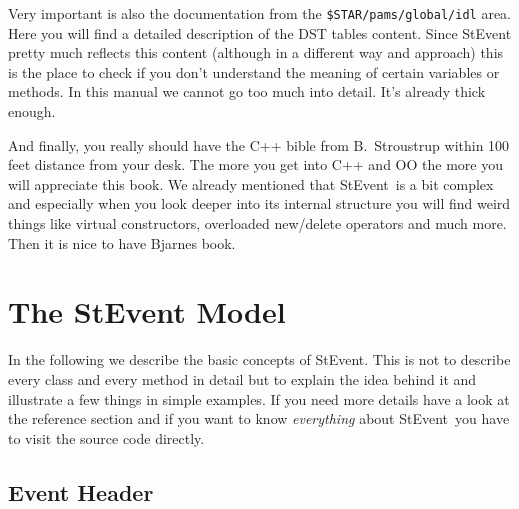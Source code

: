 \documentclass[twoside]{article}
\newcommand{\StEvent}{\textsf{StEvent}}
\begin{document}
Very important is also the documentation from the
\texttt{\$STAR/pams/global/idl} area. Here you will find a detailed
description of the DST tables content.  Since StEvent pretty much
reflects this content (although in a different way and approach) this
is the place to check if you don't understand the meaning of certain
variables or methods.  In this manual we cannot go too much into
detail. It's already thick enough.

And finally, you really should have the C++ bible from B.~Stroustrup
within 100 feet distance from your desk. The more you get into C++ and
OO the more you will appreciate this book. We already mentioned that
\StEvent\ is a bit complex and especially when you look deeper into
its internal structure you will find weird things like virtual
constructors, overloaded new/delete operators and much more.  Then it
is nice to have Bjarnes book.   \clearpage


\section{The StEvent Model} %

In the following we describe the basic concepts of \StEvent.  This is
not to describe every class and every method in detail but to explain
the idea behind it and illustrate a few things in simple examples.  If
you need more details have a look at the reference section and if you
want to know \emph{everything} about \StEvent\ you have to visit the
source code directly.

\subsection{Event Header}
  
\end{document}
